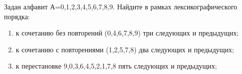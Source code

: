 \question 
Задан алфавит А={0,1,2,3,4,5,6,7,8,9}. Найдите в рамках лексикографического порядка:
\begin{enumerate}
\item  к сочетанию без повторений (0,4,6,7,8,9) три следующих и предыдущих;
\item  к сочетанию с повторениями (1,2,5,7,8) два следующих и предыдущих;
\item  к перестановке 9,0,3,6,4,5,2,1,7,8 пять следующих и предыдущих;
\end{enumerate}